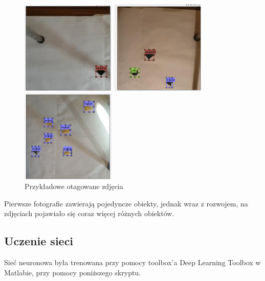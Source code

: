 \begin{figure}[H]
	\centering
	\begin{minipage}{0.30\textwidth}
		\centering
		\includegraphics[width=4.5cm]{pages/uczenie/img/przykladoweDaneV1.png} %
	\end{minipage}\hfill
	\begin{minipage}{0.3\textwidth}
		\centering
		\includegraphics[width=4.5cm]{pages/uczenie/img/przykladoweDaneV2.png} %
	\end{minipage}\hfill
	\begin{minipage}{0.3\textwidth}
		\centering
		\includegraphics[width=4.5cm]{pages/uczenie/img/przykladoweDaneV3.png} %
	\end{minipage}
						
	\caption{Przykładowe otagowane zdjęcia}
\end{figure}
Pierwsze fotografie zawierają pojedyncze obiekty, jednak wraz z rozwojem, na zdjęciach pojawiało się coraz więcej różnych obiektów.
\subsection{Uczenie sieci}
Sieć neuronowa była trenowana przy pomocy toolbox'a Deep Learning Toolbox w Matlabie, przy pomocy poniższego skryptu.

